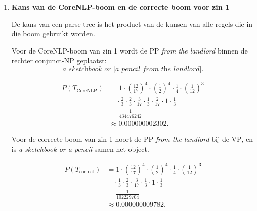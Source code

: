 \documentclass[11pt,a4paper]{article}
\newcommand{\nt}[1]{\ensuremath{\mathrm{#1}}}
\newcommand{\lex}[1]{\textit{#1}}
\begin{document}
\begin{enumerate}
Controle van de belangrijkste tellingen:
\begin{itemize}
  \item $\nt{VP}$ komt 3 keer voor: 2 keer als $\nt{VP}\rightarrow \nt{VBD}\ \nt{NP}$ en 1 keer als $\nt{VP}\rightarrow \nt{VBD}\ \nt{NP}\ \nt{PP}$.
  \item $\nt{NP}$ komt 17 keer voor: 12 keer als $\nt{NP}\rightarrow \nt{DT}\ \nt{NN}$, 2 keer als $\nt{NP}\rightarrow \nt{NP}\ \nt{PP}$, en 3 keer als $\nt{NP}\rightarrow \nt{NP}\ \nt{CC}\ \nt{NP}$.
  \item $\nt{PP}$ komt 3 keer voor, steeds als $\nt{PP}\rightarrow \nt{IN}\ \nt{NP}$.
\end{itemize}

\item \textbf{Kans van de CoreNLP-boom en de correcte boom voor zin 1}

De kans van een parse tree is het product van de kansen van alle regels die in die boom gebruikt worden.

Voor de CoreNLP-boom van zin 1 wordt de $\nt{PP}$ \lex{from the landlord} binnen de rechter conjunct-$\nt{NP}$ geplaatst:
\[
\lex{a sketchbook or [a pencil from the landlord]}.
\]

\[
\begin{aligned}
P(T_{\text{CoreNLP}})
&=1\cdot \left(\frac{12}{17}\right)^4\cdot \left(\frac{1}{2}\right)^4
\cdot \frac{1}{4}\cdot \left(\frac{1}{12}\right)^3\\
&\quad \cdot \frac{2}{3}\cdot \frac{2}{3}\cdot \frac{3}{17}\cdot \frac{1}{3}
\cdot \frac{2}{17}\cdot 1\cdot \frac{1}{3}\\
&=\frac{1}{434476242}\\
&\approx 0.000000002302.
\end{aligned}
\]

Voor de correcte boom van zin 1 hoort de $\nt{PP}$ \lex{from the landlord} bij de $\nt{VP}$, en is \lex{a sketchbook or a pencil} samen het object.

\[
\begin{aligned}
P(T_{\text{correct}})
&=1\cdot \left(\frac{12}{17}\right)^4\cdot \left(\frac{1}{2}\right)^4
\cdot \frac{1}{4}\cdot \left(\frac{1}{12}\right)^3\\
&\quad \cdot \frac{1}{3}\cdot \frac{2}{3}\cdot \frac{3}{17}\cdot \frac{1}{3}
\cdot 1\cdot \frac{1}{3}\\
&=\frac{1}{102229704}\\
&\approx 0.000000009782.
\end{aligned}
\]


\end{enumerate}
\end{document}
